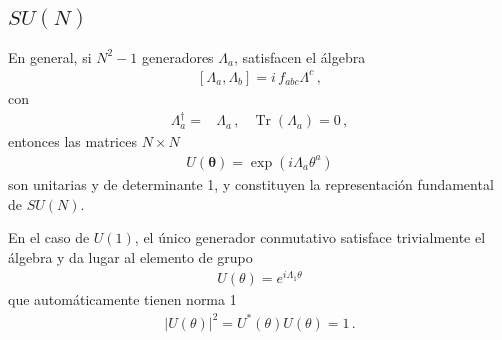 \begin{frame}
\end{frame}


\subsection{$SU(N)$}

\begin{frame}
En general, si $N^{2}-1$ generadores $\Lambda_a$, satisfacen el álgebra
\begin{align}
  \left[ \Lambda_a,\Lambda_b \right]=i\,f_{abc}\Lambda^{c}\,,
\end{align}
con
\begin{align}
  \Lambda^{\dagger}_a=&\Lambda_a\,, & \operatorname{Tr}(\Lambda_a)=0\,,
\end{align}
entonces las matrices $N\times N$  
\begin{align}
  U(\boldsymbol{\theta})=\exp\left( i \Lambda_{a}\theta^a \right)
\end{align}
son unitarias y de determinante 1, y constituyen la representación fundamental de $SU(N)$.
\end{frame}

En el caso de $U(1)$, el único generador conmutativo satisface trivialmente el álgebra y da lugar al elemento de grupo
\begin{align}
  U(\theta)=e^{i\Lambda_1 \theta}
\end{align}
que automáticamente tienen norma 1
\begin{align*}
|U(\theta)|^2= U^{*}(\theta)U(\theta)=1\,.
\end{align*}


